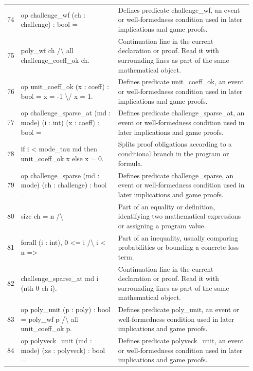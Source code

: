 \documentclass[10pt]{article}
\begin{document}
\begin{longtable}{r L{0.53\textwidth} L{0.37\textwidth}}
74 & {\ttfamily\scriptsize op challenge\_wf (ch : challenge) : bool =} & Defines predicate challenge\_wf, an event or well-formedness condition used in later implications and game proofs. \\
75 & {\ttfamily\scriptsize   poly\_wf ch /\textbackslash{} all challenge\_coeff\_ok ch.} & Continuation line in the current declaration or proof.  Read it with surrounding lines as part of the same mathematical object. \\
76 & {\ttfamily\scriptsize op unit\_coeff\_ok (x : coeff) : bool = x = -1 \textbackslash{}/ x = 1.} & Defines predicate unit\_coeff\_ok, an event or well-formedness condition used in later implications and game proofs. \\
77 & {\ttfamily\scriptsize op challenge\_sparse\_at (md : mode) (i : int) (x : coeff) : bool =} & Defines predicate challenge\_sparse\_at, an event or well-formedness condition used in later implications and game proofs. \\
78 & {\ttfamily\scriptsize   if i < mode\_tau md then unit\_coeff\_ok x else x = 0.} & Splits proof obligations according to a conditional branch in the program or formula. \\
79 & {\ttfamily\scriptsize op challenge\_sparse (md : mode) (ch : challenge) : bool =} & Defines predicate challenge\_sparse, an event or well-formedness condition used in later implications and game proofs. \\
80 & {\ttfamily\scriptsize   size ch = n /\textbackslash{}} & Part of an equality or definition, identifying two mathematical expressions or assigning a program value. \\
81 & {\ttfamily\scriptsize   forall (i : int), 0 <= i /\textbackslash{} i < n =>} & Part of an inequality, usually comparing probabilities or bounding a concrete loss term. \\
82 & {\ttfamily\scriptsize     challenge\_sparse\_at md i (nth 0 ch i).} & Continuation line in the current declaration or proof.  Read it with surrounding lines as part of the same mathematical object. \\
83 & {\ttfamily\scriptsize op poly\_unit (p : poly) : bool = poly\_wf p /\textbackslash{} all unit\_coeff\_ok p.} & Defines predicate poly\_unit, an event or well-formedness condition used in later implications and game proofs. \\
84 & {\ttfamily\scriptsize op polyveck\_unit (md : mode) (xs : polyveck) : bool =} & Defines predicate polyveck\_unit, an event or well-formedness condition used in later implications and game proofs. \\

\end{longtable}
\end{document}
